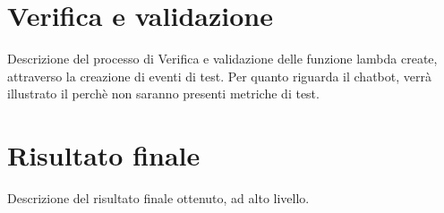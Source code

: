 \section{Verifica e validazione}
Descrizione del processo di Verifica e validazione delle funzione lambda create, attraverso la creazione di eventi di test.
Per quanto riguarda il chatbot, verrà illustrato il perchè non saranno presenti metriche di test.

\section{Risultato finale}
Descrizione del risultato finale ottenuto, ad alto livello.